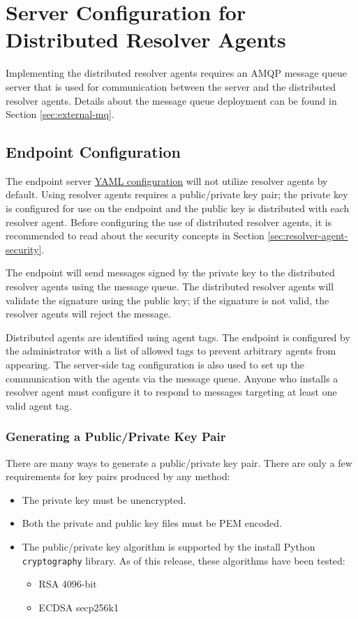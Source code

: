 \section{Server Configuration for Distributed Resolver Agents}\label{sec:resolver-server}

Implementing the distributed resolver agents requires an AMQP message queue server that
is used for communication between the \cxoneflow server and the distributed resolver
agents.  Details about the message queue deployment can be found in Section \ref{sec:external-mq}.

\subsection{\cxoneflow Endpoint Configuration}

The endpoint server \hyperref[sec:yaml-config]{YAML configuration} will not utilize resolver agents
by default.  Using resolver agents requires a public/private key pair; the private key is configured
for use on the \cxoneflow endpoint and the public key is distributed with each resolver agent.  Before
configuring the use of distributed resolver agents, it is recommended to read about the security
concepts in Section \ref{sec:resolver-agent-security}.

The \cxoneflow endpoint will send messages signed by the private key to the distributed resolver
agents using the message queue.  The distributed resolver agents will validate the signature
using the public key; if the signature is not valid, the resolver agents will reject the message.

Distributed agents are identified using agent tags.  The \cxoneflow endpoint is configured by the
administrator with a list of allowed tags to prevent arbitrary agents from appearing.  The
server-side tag configuration is also used to set up the communication with the agents via
the message queue.  Anyone who installs a resolver agent must configure it to respond to messages
targeting at least one valid agent tag.


\subsubsection{Generating a Public/Private Key Pair}

There are many ways to generate a public/private key pair.  There are only a few requirements
for key pairs produced by any method:

\begin{itemize}
  \item The private key must be unencrypted.
  \item Both the private and public key files must be PEM encoded.
  \item The public/private key algorithm is supported by the install Python \texttt{cryptography} library.
    As of this release, these algorithms have been tested:
  \begin{itemize}
      \item RSA 4096-bit
      \item ECDSA secp256k1
  \end{itemize}
\end{itemize}


